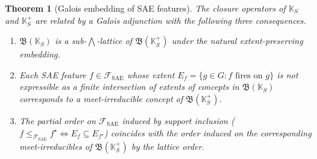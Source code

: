 \documentclass[a4paper,fleqn]{cas-dc}
\newtheorem{theorem}{Theorem}
\newcommand{\K}{\mathbb{K}}
\newcommand{\Lat}{\mathfrak{B}}
\newcommand{\SAE}{\mathrm{SAE}}
\newcommand{\Fsae}{\mathcal{F}_{\SAE}}
\begin{document}
\begin{theorem}[Galois embedding of SAE features]\label{thm:galois}
The closure operators of $\K_S$ and $\K_S^+$ are related by a Galois adjunction with the following three consequences.
\begin{enumerate}
\item $\Lat(\K_S)$ is a sub-$\bigwedge$-lattice of $\Lat(\K_S^+)$ under the natural extent-preserving embedding.
\item Each SAE feature $f \in \Fsae$ whose extent $E_f = \{g \in G : f \text{ fires on } g\}$ is not expressible as a finite intersection of extents of concepts in $\Lat(\K_S)$ corresponds to a meet-irreducible concept of $\Lat(\K_S^+)$.
\item The partial order on $\Fsae$ induced by support inclusion ($f \le_{\Fsae} f^\star \iff E_f \subseteq E_{f^\star}$) coincides with the order induced on the corresponding meet-irreducibles of $\Lat(\K_S^+)$ by the lattice order.
\end{enumerate}
\end{theorem}
\end{document}
